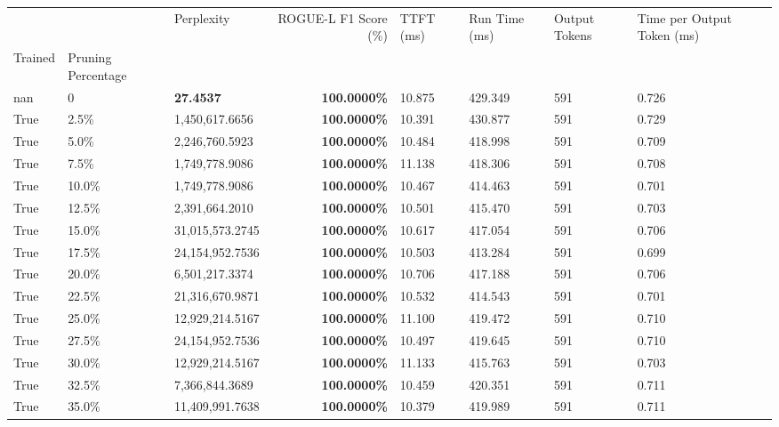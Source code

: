 \begin{table}[H]
\label{tab:evaluation-pipeline-4-trained}
\begin{tabular}{lllrllll}
\toprule
 &  & Perplexity & ROGUE-L F1 Score (\%) & TTFT (ms) & Run Time (ms) & Output Tokens & Time per Output Token (ms) \\
Trained & Pruning Percentage &  &  &  &  &  &  \\
\midrule
nan & 0 & \bfseries 27.4537 & \bfseries 100.0000\% & 10.875 & 429.349 & 591 & 0.726 \\
\cline{1-8}
True & 2.5\% & 1,450,617.6656 & \bfseries \color{red} 100.0000\% & 10.391 & 430.877 & 591 & 0.729 \\
\cline{1-8}
True & 5.0\% & 2,246,760.5923 & \bfseries \color{red} 100.0000\% & 10.484 & 418.998 & 591 & 0.709 \\
\cline{1-8}
True & 7.5\% & 1,749,778.9086 & \bfseries \color{red} 100.0000\% & 11.138 & 418.306 & 591 & 0.708 \\
\cline{1-8}
True & 10.0\% & 1,749,778.9086 & \bfseries \color{red} 100.0000\% & 10.467 & 414.463 & 591 & 0.701 \\
\cline{1-8}
True & 12.5\% & 2,391,664.2010 & \bfseries \color{red} 100.0000\% & 10.501 & 415.470 & 591 & 0.703 \\
\cline{1-8}
True & 15.0\% & 31,015,573.2745 & \bfseries \color{red} 100.0000\% & 10.617 & 417.054 & 591 & 0.706 \\
\cline{1-8}
True & 17.5\% & 24,154,952.7536 & \bfseries \color{red} 100.0000\% & 10.503 & 413.284 & 591 & 0.699 \\
\cline{1-8}
True & 20.0\% & 6,501,217.3374 & \bfseries \color{red} 100.0000\% & 10.706 & 417.188 & 591 & 0.706 \\
\cline{1-8}
True & 22.5\% & 21,316,670.9871 & \bfseries \color{red} 100.0000\% & 10.532 & 414.543 & 591 & 0.701 \\
\cline{1-8}
True & 25.0\% & 12,929,214.5167 & \bfseries \color{red} 100.0000\% & 11.100 & 419.472 & 591 & 0.710 \\
\cline{1-8}
True & 27.5\% & 24,154,952.7536 & \bfseries \color{red} 100.0000\% & 10.497 & 419.645 & 591 & 0.710 \\
\cline{1-8}
True & 30.0\% & 12,929,214.5167 & \bfseries \color{red} 100.0000\% & 11.133 & 415.763 & 591 & 0.703 \\
\cline{1-8}
True & 32.5\% & 7,366,844.3689 & \bfseries \color{red} 100.0000\% & 10.459 & 420.351 & 591 & 0.711 \\
\cline{1-8}
True & 35.0\% & 11,409,991.7638 & \bfseries \color{red} 100.0000\% & 10.379 & 419.989 & 591 & 0.711 \\

\end{tabular}
\end{table}
